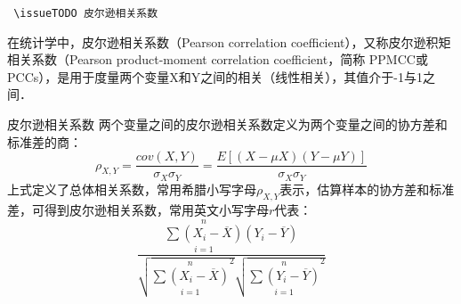 
\verb | \issueTODO 皮尔逊相关系数|

在统计学中，皮尔逊相关系数（Pearson correlation coefficient），又称皮尔逊积矩相关系数（Pearson product-moment correlation coefficient，简称 PPMCC或PCCs），是用于度量两个变量X和Y之间的相关（线性相关），其值介于-1与1之间．
\begin{definition}{皮尔逊相关系数}\label{PearsR_def1}
两个变量之间的皮尔逊相关系数定义为两个变量之间的协方差和标准差的商：
\begin{equation}
\rho_{X,Y}=\frac{cov(X,Y)}{\sigma_{X}\sigma_{Y}}=\frac{E[(X-\mu X)(Y-\mu Y)]}{\sigma_{X}\sigma_{Y}}
\end{equation}
上式定义了总体相关系数，常用希腊小写字母$\rho_{X,Y}$表示，估算样本的协方差和标准差，可得到皮尔逊相关系数，常用英文小写字母$r$代表：
\begin{equation}
\frac{\displaystyle\overset n{\underset{i=1}{\sum\left(X_i-\overline X\right)}}\left(Y_i-\overline Y\right)}{\sqrt{\overset n{\underset{i=1}{\sum\left(X_i-\overline X\right)}}^2}\sqrt{\overset n{\underset{i=1}{\sum\left(Y_i-\overline Y\right)}}^2}}
\end{equation}
\end{definition}